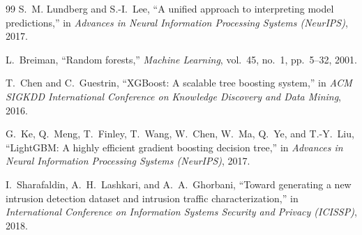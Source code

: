 \documentclass[12pt,a4paper,oneside]{report}
\begin{document}
\begin{thebibliography}{99}
S.~M. Lundberg and S.-I.~Lee,
``A unified approach to interpreting model predictions,'' in \textit{Advances in Neural Information Processing Systems (NeurIPS)}, 2017.

L.~Breiman,
``Random forests,'' \textit{Machine Learning}, vol.~45, no.~1, pp.~5--32, 2001.

T.~Chen and C.~Guestrin,
``XGBoost: A scalable tree boosting system,'' in \textit{ACM SIGKDD International Conference on Knowledge Discovery and Data Mining}, 2016.

G.~Ke, Q.~Meng, T.~Finley, T.~Wang, W.~Chen, W.~Ma, Q.~Ye, and T.-Y.~Liu,
``LightGBM: A highly efficient gradient boosting decision tree,'' in \textit{Advances in Neural Information Processing Systems (NeurIPS)}, 2017.

I.~Sharafaldin, A.~H.~Lashkari, and A.~A.~Ghorbani,
``Toward generating a new intrusion detection dataset and intrusion traffic characterization,'' in \textit{International Conference on Information Systems Security and Privacy (ICISSP)}, 2018.

\end{thebibliography}
\end{document}
